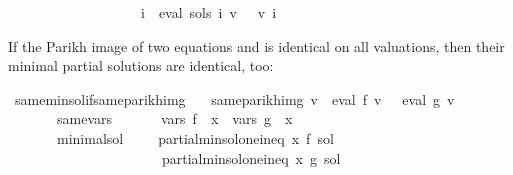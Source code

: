 \begin{isabellebody}
\ \ \ \ \ \ \ \ \ \ \ \ \ \ \ \ \ \ {\isasymlongrightarrow}\ {\isacharparenleft}{\kern0pt}{\isasymforall}i{\isachardot}{\kern0pt}\ {\isasymPsi}\ {\isacharparenleft}{\kern0pt}eval\ {\isacharparenleft}{\kern0pt}sols\ i{\isacharparenright}{\kern0pt}\ v{\isacharprime}{\kern0pt}{\isacharparenright}{\kern0pt}\ {\isasymsubseteq}\ {\isasymPsi}\ {\isacharparenleft}{\kern0pt}v{\isacharprime}{\kern0pt}\ i{\isacharparenright}{\kern0pt}{\isacharparenright}{\kern0pt}{\isacharparenright}{\kern0pt}{\isachardoublequoteclose}%
\begin{isamarkuptext}%
If the Parikh image of two equations  and  is identical on all valuations, then their
minimal partial solutions are identical, too:%
\end{isamarkuptext}\isamarkuptrue%
\isamarkupfalse%
\ same{\isacharunderscore}{\kern0pt}min{\isacharunderscore}{\kern0pt}sol{\isacharunderscore}{\kern0pt}if{\isacharunderscore}{\kern0pt}same{\isacharunderscore}{\kern0pt}parikh{\isacharunderscore}{\kern0pt}img{\isacharcolon}{\kern0pt}\isanewline
\ \ \ same{\isacharunderscore}{\kern0pt}parikh{\isacharunderscore}{\kern0pt}img{\isacharcolon}{\kern0pt}\ {\isachardoublequoteopen}{\isasymforall}v{\isachardot}{\kern0pt}\ {\isasymPsi}\ {\isacharparenleft}{\kern0pt}eval\ f\ v{\isacharparenright}{\kern0pt}\ {\isacharequal}{\kern0pt}\ {\isasymPsi}\ {\isacharparenleft}{\kern0pt}eval\ g\ v{\isacharparenright}{\kern0pt}{\isachardoublequoteclose}\isanewline
\ \ \ \ \ \ \ same{\isacharunderscore}{\kern0pt}vars{\isacharcolon}{\kern0pt}\ \ \ \ \ \ \ {\isachardoublequoteopen}vars\ f\ {\isacharminus}{\kern0pt}\ {\isacharbraceleft}{\kern0pt}x{\isacharbraceright}{\kern0pt}\ {\isacharequal}{\kern0pt}\ vars\ g\ {\isacharminus}{\kern0pt}\ {\isacharbraceleft}{\kern0pt}x{\isacharbraceright}{\kern0pt}{\isachardoublequoteclose}\isanewline
\ \ \ \ \ \ \ minimal{\isacharunderscore}{\kern0pt}sol{\isacharcolon}{\kern0pt}\ \ \ \ \ {\isachardoublequoteopen}partial{\isacharunderscore}{\kern0pt}min{\isacharunderscore}{\kern0pt}sol{\isacharunderscore}{\kern0pt}one{\isacharunderscore}{\kern0pt}ineq\ x\ f\ sol{\isachardoublequoteclose}\isanewline
\ \ \ \ \ \ \ \ \ \ \ \ \ \ \ \ \ \ \ \ \ \ {\isachardoublequoteopen}partial{\isacharunderscore}{\kern0pt}min{\isacharunderscore}{\kern0pt}sol{\isacharunderscore}{\kern0pt}one{\isacharunderscore}{\kern0pt}ineq\ x\ g\ sol{\isachardoublequoteclose}\isanewline
%
\isadelimproof
%
\endisadelimproof
%
\isatagproof
{}\isamarkupfalse%
\ {\isacharminus}{\kern0pt}\isanewline

\end{isabellebody}
